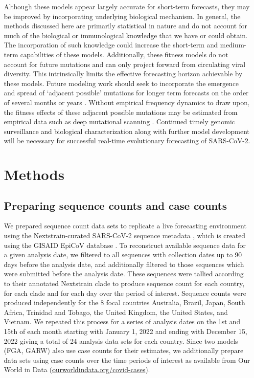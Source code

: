 Although these models appear largely accurate for short-term forecasts, they may be improved by incorporating underlying biological mechanism.
In general, the methods discussed here are primarily statistical in nature and do not account for much of the biological or immunological knowledge that we have or could obtain.
The incorporation of such knowledge could increase the short-term and medium-term capabilities of these models.
Additionally, these fitness models do not account for future mutations and can only project forward from circulating viral diversity.
This intrinsically limits the effective forecasting horizon achievable by these models.
Future modeling work should seek to incorporate the emergence and spread of `adjacent possible' mutations for longer term forecasts on the order of several months or years \cite{kauffman1993origins}.
Without empirical frequency dynamics to draw upon, the fitness effects of these adjacent possible mutations may be estimated from empirical data such as deep mutational scanning \cite{cao2022ba, greaney2022antibody, dadonaite2023full}.
Continued timely genomic surveillance and biological characterization along with further model development will be necessary for successful real-time evolutionary forecasting of SARS-CoV-2.

\section*{Methods}

\subsection*{Preparing sequence counts and case counts}

We prepared sequence count data sets to replicate a live forecasting environment using the Nextstrain-curated SARS-CoV-2 sequence metadata \cite{Hadfield2018}, which is created using the GISAID EpiCoV database \cite{khare2021gisaid}.
To reconstruct available sequence data for a given analysis date, we filtered to all sequences with collection dates up to 90 days before the analysis date, and additionally filtered to those sequences which were submitted before the analysis date.
These sequences were tallied according to their annotated Nextstrain clade to produce sequence count for each country, for each clade and for each day over the period of interest.
Sequence counts were produced independently for the 8 focal countries Australia, Brazil, Japan, South Africa, Trinidad and Tobago, the United Kingdom, the United States, and Vietnam.
We repeated this process for a series of analysis dates on the 1st and 15th of each month starting with January 1, 2022 and ending with December 15, 2022 giving a total of 24 analysis data sets for each country.
Since two models (FGA, GARW) also use case counts for their estimates, we additionally prepare data sets using case counts over the time periods of interest as available from Our World in Data (\href{https://ourworldindata.org/covid-cases}{ourworldindata.org/covid-cases}).

